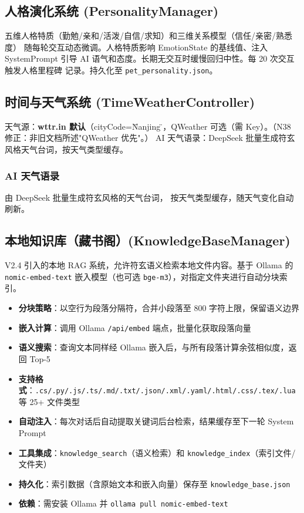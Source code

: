 \documentclass[12pt,a4paper]{ctexart}
\begin{document}
\subsection{人格演化系统 (PersonalityManager)}

五维人格特质（勤勉/亲和/活泼/自信/求知）和三维关系模型（信任/亲密/熟悉度）
随每轮交互动态微调。人格特质影响 EmotionState 的基线值、注入 SystemPrompt
引导 AI 语气和态度。长期无交互时缓慢回归中性。每 20 次交互触发人格里程碑
记录。持久化至 \texttt{pet\_personality.json}。

\subsection{时间与天气系统 (TimeWeatherController)}

天气源：\textbf{wttr.in 默认}（cityCode=\"Nanjing\"），QWeather 可选（需 Key）。（N38 修正：非旧文档所述"QWeather 优先"。）
AI 天气语录：DeepSeek 批量生成符玄风格天气台词，按天气类型缓存。

\subsubsection{AI 天气语录}

由 DeepSeek 批量生成符玄风格的天气台词，
按天气类型缓存，随天气变化自动刷新。

\subsection{本地知识库（藏书阁）(KnowledgeBaseManager)}

V2.4 引入的本地 RAG 系统，允许符玄语义检索本地文件内容。基于 Ollama 的
\texttt{nomic-embed-text} 嵌入模型（也可选 \texttt{bge-m3}），对指定文件夹进行自动分块索引。

\begin{itemize}
    \item \textbf{分块策略}：以空行为段落分隔符，合并小段落至 800 字符上限，保留语义边界
    \item \textbf{嵌入计算}：调用 Ollama \texttt{/api/embed} 端点，批量化获取段落向量
    \item \textbf{语义搜索}：查询文本同样经 Ollama 嵌入后，与所有段落计算余弦相似度，返回 Top-5
    \item \textbf{支持格式}：\texttt{.cs/.py/.js/.ts/.md/.txt/.json/.xml/.yaml/.html/.css/.tex/.lua}
          等 25+ 文件类型
    \item \textbf{自动注入}：每次对话后自动提取关键词后台检索，结果缓存至下一轮 System Prompt
    \item \textbf{工具集成}：\texttt{knowledge\_search}（语义检索）和 \texttt{knowledge\_index}（索引文件/文件夹）
    \item \textbf{持久化}：索引数据（含原始文本和嵌入向量）保存至 \texttt{knowledge\_base.json}
    \item \textbf{依赖}：需安装 Ollama 并 \texttt{ollama pull nomic-embed-text}
\end{itemize}
\end{document}
